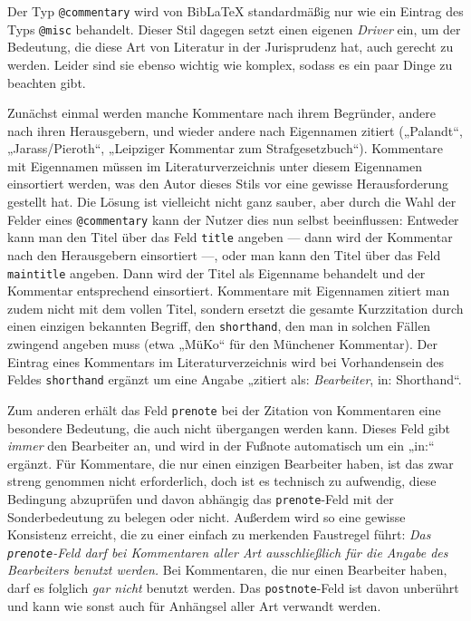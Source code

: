 \documentclass[11pt,a4paper,DIV=calc]{scrartcl}
\newcommand\software[1]{\textsf{#1}}
\newcommand\Biblatex{\software{Bib\LaTeX{}}\xspace}
\begin{document}
Der Typ \verb+@commentary+ wird von \Biblatex standardmäßig nur wie
ein Eintrag des Typs \verb+@misc+ behandelt. Dieser Stil dagegen
setzt einen eigenen \emph{Driver} ein, um der Bedeutung, die diese Art
von Literatur in der Jurisprudenz hat, auch gerecht zu werden. Leider
sind sie ebenso wichtig wie komplex, sodass es ein paar Dinge zu
beachten gibt.

Zunächst einmal werden manche Kommentare nach ihrem Begründer, andere
nach ihren Herausgebern, und wieder andere nach Eigennamen zitiert
(„Palandt“, „Jarass/Pieroth“, „Leipziger Kommentar zum
Strafgesetzbuch“). Kommentare mit Eigennamen müssen im
Literaturverzeichnis unter diesem Eigennamen einsortiert werden, was
den Autor dieses Stils vor eine gewisse Herausforderung gestellt
hat. Die Lösung ist vielleicht nicht ganz sauber, aber durch die Wahl
der Felder eines \verb+@commentary+ kann der Nutzer dies nun selbst
beeinflussen: Entweder kann man den Titel über das Feld \verb+title+
angeben — dann wird der Kommentar nach den Herausgebern einsortiert —,
oder man kann den Titel über das Feld \verb+maintitle+ angeben. Dann
wird der Titel als Eigenname behandelt und der Kommentar entsprechend
einsortiert. Kommentare mit Eigennamen zitiert man zudem nicht mit dem
vollen Titel, sondern ersetzt die gesamte Kurzzitation durch einen
einzigen bekannten Begriff, den \verb+shorthand+, den man in solchen
Fällen zwingend angeben muss (etwa „MüKo“ für den Münchener
Kommentar). Der Eintrag eines Kommentars im Literaturverzeichnis wird
bei Vorhandensein des Feldes \verb+shorthand+ ergänzt um eine Angabe
„zitiert als: \textit{Bearbeiter}, in: Shorthand“.

Zum anderen erhält das Feld \verb+prenote+ bei der Zitation von
Kommentaren eine besondere Bedeutung, die auch nicht übergangen werden
kann. Dieses Feld gibt \emph{immer} den Bearbeiter an, und wird in der
Fußnote automatisch um ein „in:“ ergänzt. Für Kommentare, die nur
einen einzigen Bearbeiter haben, ist das zwar streng genommen nicht
erforderlich, doch ist es technisch zu aufwendig, diese Bedingung
abzuprüfen und davon abhängig das \verb+prenote+-Feld mit der
Sonderbedeutung zu belegen oder nicht. Außerdem wird so eine gewisse
Konsistenz erreicht, die zu einer einfach zu merkenden Faustregel
führt: \emph{Das \texttt{prenote}-Feld darf bei Kommentaren aller Art
  ausschließlich für die Angabe des Bearbeiters benutzt werden.} Bei
Kommentaren, die nur einen Bearbeiter haben, darf es folglich
\emph{gar nicht} benutzt werden. Das \verb+postnote+-Feld ist davon
unberührt und kann wie sonst auch für Anhängsel aller Art verwandt
werden.
\end{document}
